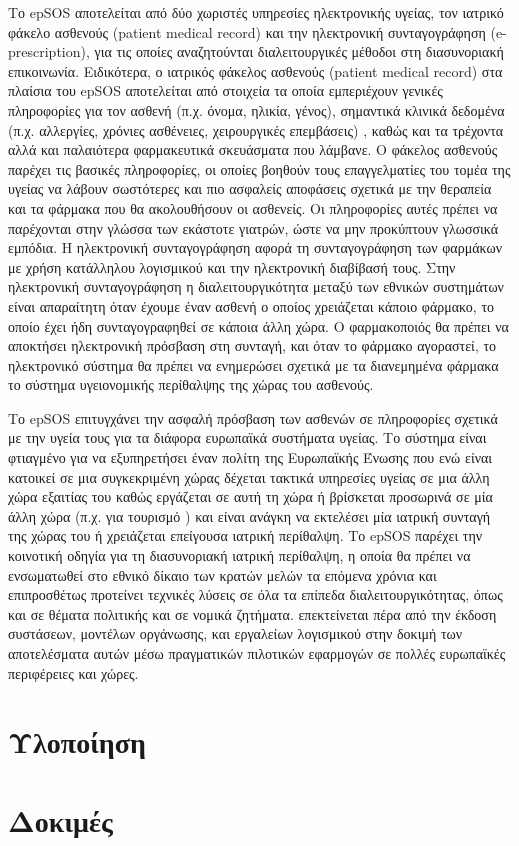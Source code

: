 		Το epSOS αποτελείται από δύο χωριστές υπηρεσίες ηλεκτρονικής υγείας, τον ιατρικό φάκελο ασθενούς (patient medical record) και την ηλεκτρονική συνταγογράφηση (e-prescription),  για τις οποίες αναζητούνται διαλειτουργικές μέθοδοι στη διασυνοριακή επικοινωνία. Ειδικότερα, ο ιατρικός φάκελος ασθενούς  (patient medical record) στα πλαίσια του epSOS αποτελείται από στοιχεία τα οποία εμπεριέχουν γενικές πληροφορίες για τον ασθενή (π.χ. όνομα, ηλικία, γένος), σημαντικά κλινικά δεδομένα (π.χ. αλλεργίες, χρόνιες ασθένειες, χειρουργικές επεμβάσεις) , καθώς και τα τρέχοντα αλλά και παλαιότερα φαρμακευτικά σκευάσματα που λάμβανε. Ο φάκελος ασθενούς παρέχει τις βασικές πληροφορίες, οι οποίες βοηθούν τους επαγγελματίες του τομέα της υγείας να λάβουν σωστότερες και πιο ασφαλείς αποφάσεις σχετικά με την θεραπεία και τα φάρμακα που θα ακολουθήσουν οι ασθενείς. Οι πληροφορίες αυτές πρέπει να παρέχονται στην γλώσσα των εκάστοτε γιατρών, ώστε να μην προκύπτουν γλωσσικά εμπόδια. Η ηλεκτρονική συνταγογράφηση αφορά τη συνταγογράφηση των φαρμάκων με χρήση κατάλληλου λογισμικού και την ηλεκτρονική διαβίβασή τους. Στην ηλεκτρονική συνταγογράφηση η διαλειτουργικότητα μεταξύ των εθνικών συστημάτων είναι απαραίτητη όταν έχουμε έναν ασθενή ο οποίος χρειάζεται κάποιο φάρμακο, το οποίο έχει ήδη συνταγογραφηθεί σε κάποια άλλη χώρα.  Ο φαρμακοποιός θα πρέπει να αποκτήσει ηλεκτρονική πρόσβαση στη συνταγή, και όταν το φάρμακο αγοραστεί, το ηλεκτρονικό σύστημα θα πρέπει να ενημερώσει σχετικά με τα διανεμημένα φάρμακα το σύστημα υγειονομικής περίθαλψης της χώρας του ασθενούς. \cite{epSOS}
		
		 Το epSOS επιτυγχάνει την ασφαλή πρόσβαση των ασθενών σε πληροφορίες σχετικά με την υγεία τους για τα διάφορα ευρωπαϊκά συστήματα υγείας. Το σύστημα είναι φτιαγμένο για να εξυπηρετήσει έναν πολίτη της Ευρωπαϊκής Ένωσης  που ενώ είναι κατοικεί σε μια συγκεκριμένη χώρας δέχεται τακτικά υπηρεσίες υγείας σε μια άλλη χώρα εξαιτίας του καθώς εργάζεται σε αυτή τη χώρα ή βρίσκεται προσωρινά σε μία άλλη χώρα (π.χ. για τουρισμό ) και είναι ανάγκη να εκτελέσει μία ιατρική συνταγή της χώρας του ή χρειάζεται επείγουσα ιατρική περίθαλψη. Το epSOS παρέχει την κοινοτική οδηγία για τη διασυνοριακή ιατρική περίθαλψη, η οποία θα πρέπει να ενσωματωθεί στο εθνικό δίκαιο των κρατών μελών τα επόμενα χρόνια και επιπροσθέτως προτείνει τεχνικές λύσεις σε όλα τα επίπεδα διαλειτουργικότητας, όπως και σε θέματα πολιτικής και σε νομικά ζητήματα. επεκτείνεται πέρα από την έκδοση συστάσεων, μοντέλων οργάνωσης, και εργαλείων λογισμικού  στην  δοκιμή των αποτελέσματα αυτών μέσω πραγματικών πιλοτικών εφαρμογών σε πολλές ευρωπαϊκές περιφέρειες και χώρες.
		 


\section{Υλοποίηση}
\section{Δοκιμές}
